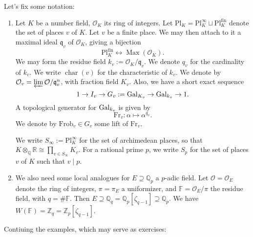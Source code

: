 \documentclass[reqno]{amsart} 
\begin{document}
\begin{example}
\begin{enumerate}[(a)]
    Let's fix some notation:
    \begin{enumerate}
    \item\label{enumerate:cq6r3f3t8d} Let $K$ be a number field, $\mathcal{O}_K$ its ring of integers.  Let $\mathrm{P l}_K = \mathrm{P l}_K^\infty \sqcup \mathrm{P l}_K^{\mathrm{fin}}$ denote the set of places $v$ of $K$.  Let $v$ be a finite place.  We may then attach to it a maximal ideal $\mathfrak{q}_v$ of $\mathcal{O}_K$, giving a bijection
      \begin{equation*}
        \mathrm{P l}_K^{\mathrm{fin}} \leftrightarrow \operatorname{Max}(\mathcal{O}_K).
      \end{equation*}
      We may form the residue field $k_v := \mathcal{O}_K / \mathfrak{q}_v$.  We denote $q_v$ for the cardinality of $k_v$.  We write $\operatorname{char}(v)$ for the characteristic of $k_v$.  We denote by $\mathcal{O}_v = \varprojlim \mathcal{O} / \mathfrak{q}_v^n$, with fraction field $K_v$.  Also, we have a short exact sequence
      \begin{equation*}
        1 \rightarrow I_v \rightarrow G_v := \operatorname{Gal}_{K_v} \rightarrow \operatorname{Gal}_{k_v} \rightarrow 1.
      \end{equation*}
      A topological generator for $\operatorname{Gal}_{k_v}$ is given by
      \begin{equation*}
        \mathrm{Fr}_v : \alpha \mapsto \alpha^{q_v}.
      \end{equation*}
      We denote by $\mathrm{Frob}_v \in G_v$ some lift of $\mathrm{Fr}_v$.

      We write $S_\infty := \mathrm{P l}_K^\infty$ for the set of archimedean places, so that $K \otimes_{\mathbb{Q}} \mathbb{R} \cong \prod_{v \in S_\infty} K_v$.  For a rational prime $p$, we write $S_p$ for the set of places $v$ of $K$ such that $v \mid p$.
    \item We also need some local analogues for $E \supseteq \mathbb{Q}_p$ a $p$-adic field.  Let $\mathcal{O} = \mathcal{O}_E$ denote the ring of integers, $\pi = \pi_E$ a uniformizer, and $\mathbb{F} = \mathcal{O}_E / \pi$ the residue field, with $q = \# \mathbb{F}$.  Then $E \supseteq \mathbb{Q}_q = \mathbb{Q}_p[\zeta_{q - 1}] \supseteq \mathbb{Q}_p$.  We have $W(\mathbb{F}) = \mathbb{Z}_q = \mathbb{Z}_p[\zeta_{q - 1}]$.
    \end{enumerate}

    Contiuing the examples, which may serve as exercises:
    

\end{enumerate}
\end{example}
\end{document}
